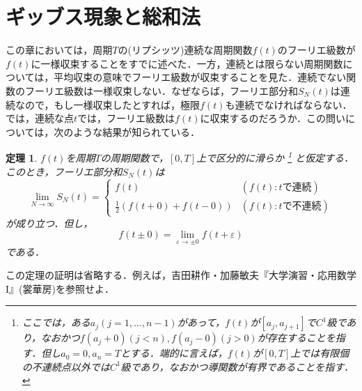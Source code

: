 \documentclass[a4j]{jsbook}
\newtheorem{theorem}{定理}
\numberwithin{theorem}{chapter}  %
\begin{document}
\section{ギッブス現象と総和法} \label{sec1-11}
この章においては，周期\(T\)の(リプシッツ)連続な周期関数\(f(t)\)のフーリエ級数が\(f(t)\)に一様収束することをすでに述べた．一方，連続とは限らない周期関数については，平均収束の意味でフーリエ級数が収束することを見た．連続でない関数のフーリエ級数は一様収束しない．なぜならば，フーリエ部分和\(S_N(t)\)は連続なので，もし一様収束したとすれば，極限\(f(t)\)も連続でなければならない．では，連続な点\(t\)では，フーリエ級数は\(f(t)\)に収束するのだろうか．この問いについては，次のような結果が知られている．
\begin{theorem}
\label{th1-13}
\(f(t)\)を周期\(T\)の周期関数で，\([0, T]\)上で区分的に滑らか
\footnote{ここでは，ある\(a_j(j=1, \dots, n-1)\)があって，\(f(t)\)が\([a_j, a_{j+1}]\)で\(C^1\)級であり，なおかつ\(f(a_j+0)(j<n), f(a_j-0)(j>0)\)が存在することを指す．但し\(a_0=0, a_n=T\)とする．端的に言えば，\(f(t)\)が\([0, T]\)上では有限個の不連続点以外では\(C^1\)級であり，なおかつ導関数が有界であることを指す．
}
と仮定する．このとき，フーリエ部分和\(S_N(t)\)は
\begin{equation*}
    \lim_{N\to\infty}S_N(t)= \begin{cases}
    f(t) & (f(t):t\mbox{で連続}) \\
    \frac{1}{2}(f(t+0)+f(t-0)) & (f(t):t\mbox{で不連続})
    \end{cases}
\end{equation*}
が成り立つ．但し，
\begin{equation*}
    f(t\pm 0)=\lim_{\varepsilon\to\pm 0}f(t+\varepsilon)
\end{equation*}
である．
\end{theorem}
この定理の証明は省略する．例えば，吉田耕作・加藤敏夫『大学演習・応用数学I』(裳華房)を参照せよ．
\end{document}
